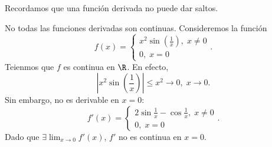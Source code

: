 \begin{observation}
\normalfont Recordamos que una función derivada no puede dar saltos.
\end{observation}
\begin{eg}
\normalfont No todas las funciones derivadas son continuas. Consideremos la función 
\[ f\left(x\right) = 
\begin{cases}
x^{2}\sin\left(\frac{1}{x}\right), \; x \neq 0 \\
0, \; x = 0
\end{cases}
.\]
Teienmos que $\displaystyle f $ es continua en $\displaystyle \R $. En efecto, 
\[ \left|x^{2}\sin\left(\frac{1}{x}\right)\right| \leq x^{2} \to 0, \; x \to 0 .\]
Sin embargo, no es derivable en $\displaystyle x = 0 $:
\[ f'\left(x\right) = 
\begin{cases}
	2\sin \frac{1}{x} - \cos \frac{1}{x}, \; x \neq 0 \\
	0, \; x = 0
\end{cases}
.\]
Dado que $\displaystyle \exists\lim_{x \to 0}f'\left(x\right) $, $\displaystyle f' $ no es continua en $\displaystyle x = 0 $.
\end{eg}
